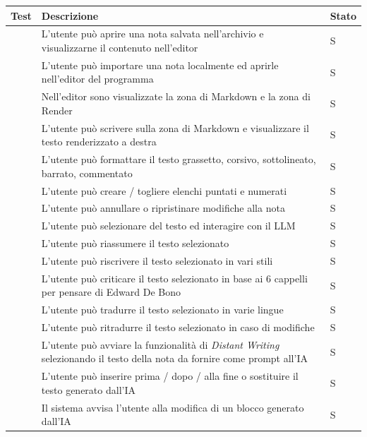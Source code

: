 \documentclass[a4paper,10pt]{article}
\begin{document}
\newcommand{\testA}{%
    \stepcounter{TA@}%
    \noindent{TA-\arabic{TA@}}\quad\par
}

\begin{longtable}{|l|p{8cm}|p{1.5cm}|}
    \hline
    \textbf{Test} & \textbf{Descrizione} & \textbf{Stato} \\ \hline
    \endfirsthead
    \hline
    \testA & L'utente può aprire una nota salvata nell'archivio e visualizzarne il contenuto nell'editor & S \\ \hline
    \testA & L'utente può importare una nota localmente ed aprirle nell'editor del programma & S \\ \hline
    \testA & Nell'editor sono visualizzate la zona di Markdown e la zona di Render & S \\ \hline
    \testA & L'utente può scrivere sulla zona di Markdown e visualizzare il testo renderizzato a destra & S \\ \hline
    \testA & L'utente può formattare il testo grassetto, corsivo, sottolineato, barrato, commentato & S \\ \hline
    \testA & L'utente può creare / togliere elenchi puntati e numerati & S \\ \hline
    \testA & L'utente può annullare o ripristinare modifiche alla nota & S \\ \hline
    \testA & L'utente può selezionare del testo ed interagire con il LLM & S \\ \hline
    \testA & L'utente può riassumere il testo selezionato & S \\ \hline
    \testA & L'utente può riscrivere il testo selezionato in vari stili & S \\ \hline
    \testA & L'utente può criticare il testo selezionato in base ai 6 cappelli per pensare di Edward De Bono & S \\ \hline
    \testA & L'utente può tradurre il testo selezionato in varie lingue & S \\ \hline
    \testA & L'utente può ritradurre il testo selezionato in caso di modifiche & S \\ \hline
    \testA & L'utente può avviare la funzionalità di \textit{Distant Writing} selezionando il testo della nota da fornire come prompt all'IA & S \\ \hline
    \testA & L'utente può inserire prima / dopo / alla fine o sostituire il testo generato dall'IA & S \\ \hline
    \testA & Il sistema avvisa l'utente alla modifica di un blocco generato dall'IA & S \\ \hline

\end{longtable}
\end{document}
